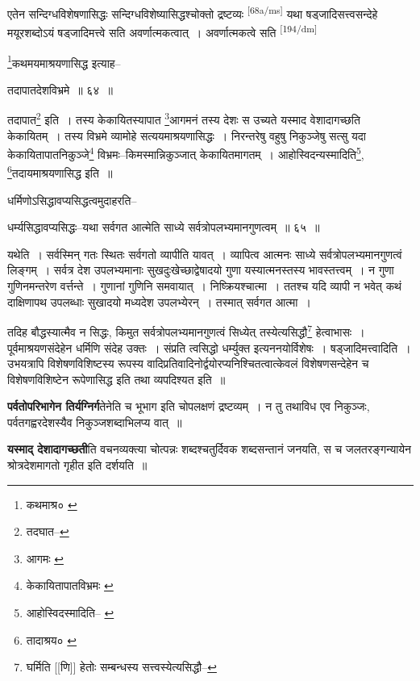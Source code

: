 \documentclass[article,12pt,a4paper]{memoir}
\begin{document}
	  \pstart एतेन सन्दिग्धविशेषणासिद्धः सन्दिग्धविशेष्यासिद्धश्चोक्तो द्रष्टव्यः \leavevmode\textsuperscript{\rmlatinfont\tiny [68a/ms]} यथा षड्जादिसत्त्वसन्देहे मयूरशब्दोऽयं षड्जादिमत्त्वे सति अवर्णात्मकत्वात् । अवर्णात्मकत्वे सति  \leavevmode\textsuperscript{\rmlatinfont\tiny [194/dm]} 
	  
	\footnote{कथमाश्र० \cite{dp-msA} \cite{dp-msB} \cite{dp-edP} \cite{dp-edH} \cite{dp-edE}}कथमयमाश्रयणासिद्ध इत्याह-- 
	  
	तदापातदेशविभ्रमे ॥ ६४ ॥ 
	  
	तदापात\footnote{तदघात--\cite{dp-msA}} इति । तस्य केकायितस्यापात \footnote{आगमः \cite{dp-msC}}आगमनं तस्य देशः स उच्यते यस्माद वेशादागच्छति केकायितम् । तस्य विभ्रमे व्यामोहे सत्ययमाश्रयणासिद्धः । निरन्तरेषु वहुषु निकुञ्जेषु सत्सु यदा केकायितापातनिकुञ्जे\footnote{केकायितापातविभ्रमः \cite{dp-msA} \cite{dp-edP} \cite{dp-edH}} विभ्रमः--किमस्मान्निकुञ्जात् केकायितमागतम् । आहोस्विदन्यस्मादिति\footnote{आहोस्विदस्मादिति--\cite{dp-msA} \cite{dp-edP} \cite{dp-edH} \cite{dp-edN}}, \footnote{तादाश्रय० \cite{dp-msA} \cite{dp-msB} \cite{dp-edP} \cite{dp-edH} \cite{dp-edE} \cite{dp-edN}}तदायमाश्रयणासिद्ध इति ॥ 
	  
	धर्मिणोऽसिद्धावप्यसिद्धत्वमुदाहरति-- 
	  
	धर्म्यसिद्धावप्यसिद्धः--यथा सर्वगत आत्मेति साध्ये सर्वत्रोपलभ्यमानगुणत्वम् ॥ ६५ ॥ 
	  
	यथेति । सर्वस्मिन् गतः स्थितः सर्वगतो व्यापीति यावत् । व्यापित्व आत्मनः साध्ये सर्वत्रोपलभ्यमानगुणत्वं लिङ्गम् । सर्वत्र देश उपलभ्यमानाः सुखदुःखेच्छाद्वेषादयो गुणा यस्यात्मनस्तस्य भावस्तत्त्वम् । न गुणा गुणिनमन्तरेण वर्त्तन्ते । गुणानां गुणिनि समवायात् । निष्क्रियश्चात्मा । ततश्च यदि व्यापी न भवेत् कथं दाक्षिणापथ उपलब्धाः सुखादयो मध्यदेश उपलभ्येरन् । तस्मात् सर्वगत आत्मा । 
	  
	तदिह बौद्धस्यात्मैव न सिद्धः, किमुत सर्वत्रोपलभ्यमानगुणत्वं सिध्येत् तस्येत्यसिद्धौ\footnote{घर्मिति [[णि]] हेतोः सम्बन्धस्य सत्त्वस्येत्यसिद्धौ--\cite{dp-msD-n}} हेत्वाभासः । पूर्वमाश्रयणसंदेहेन धर्मिणि संदेह उक्तः । संप्रति त्वसिद्धो धर्म्युक्त इत्यननयोर्विशेषः । षड्जादिमत्त्वादिति । उभयत्रापि विशेषणविशिष्टस्य रूपस्य वादिप्रतिवादिनोर्द्वयोरप्यनिश्चितत्वात्केवलं विशेषणसन्देहेन च विशेषणविशिष्टेन रूपेणासिद्ध इति तथा व्यपदिश्यत इति ॥
	\pend
      

	  \pstart \textbf{पर्वतोपरिभागेन तिर्यग्निर्ग}तेनेति च भूभाग इति चोपलक्षणं द्रष्टव्यम् । न तु तथाविध एव निकुञ्जः, पर्वतगह्वरदेशस्यैव निकुञ्जशब्दाभिलप्य वात् ॥
	\pend
      

	  \pstart \textbf{यस्माद् देशादागच्छती}ति वचनव्यक्त्या चोत्पन्नः शब्दश्चतुर्दिवक शब्दसन्तानं जनयति, स च जलतरङ्गन्यायेन श्रोत्रदेशमागतो गृहीत इति दर्शयति ॥
	\pend
      
\end{document}
